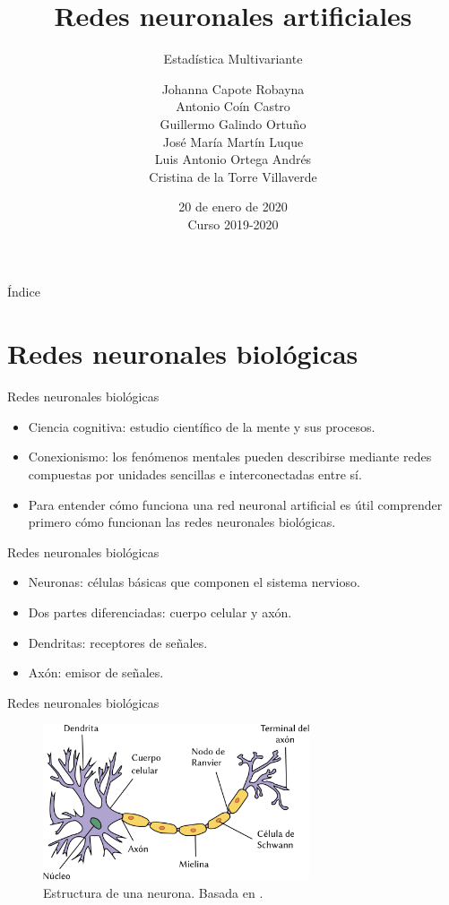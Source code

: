\documentclass[spanish]{beamer}
\title{Redes neuronales artificiales}
\subtitle{Estadística Multivariante}
\author{
  Johanna Capote Robayna\texorpdfstring{\\}{}
  Antonio Coín Castro\texorpdfstring{\\}{}
  Guillermo Galindo Ortuño\texorpdfstring{\\}{}
  José María Martín Luque\texorpdfstring{\\}{}
  Luis Antonio Ortega Andrés\texorpdfstring{\\}{}
  Cristina de la Torre Villaverde
}
\institute{\normalsize Universidad de Granada}
\date{20 de enero de 2020\texorpdfstring{\\}{} \small Curso 2019-2020}
\begin{document}
\maketitle

\begin{frame}{Índice}
  \tableofcontents
\end{frame}

\section{Redes neuronales biológicas}

\begin{frame}{Redes neuronales biológicas}
  \begin{itemize}
    \item Ciencia cognitiva: estudio científico de la mente y sus procesos.
    \item Conexionismo: los fenómenos mentales pueden describirse mediante redes compuestas por unidades sencillas e interconectadas entre sí.
    \item Para entender cómo funciona una red neuronal artificial es útil comprender primero cómo funcionan las redes neuronales biológicas.
  \end{itemize}
\end{frame}

\begin{frame}{Redes neuronales biológicas}
  \begin{itemize}
    \item Neuronas: células básicas que componen el sistema nervioso.
    \item Dos partes diferenciadas: cuerpo celular y axón.
    \item Dendritas: receptores de señales.
    \item Axón: emisor de señales.
  \end{itemize}
\end{frame}

\begin{frame}{Redes neuronales biológicas}
  \begin{figure}[b]
    \centering
    \includegraphics[width=0.7\textwidth]{img/neurona}
    \caption{Estructura de una neurona. Basada en \parencite{dhp1080_neurona_2007}.}
    \label{fig:neurona}
  \end{figure}
\end{frame}
\end{document}
